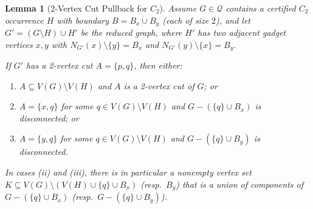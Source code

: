 \documentclass[12pt]{article}
\newtheorem{lemma}[theorem]{Lemma}
\begin{document}
\begin{lemma}[2-Vertex Cut Pullback for $C_2$]
\label{lem:pullback_cut_c2}
Assume $G\in\mathcal{Q}$ contains a certified $C_2$ occurrence $H$ with boundary
$B=B_x\dot\cup B_y$ (each of size $2$), and let $G'=(G\setminus H)\cup H'$ be the reduced graph,
where $H'$ has two adjacent gadget vertices $x,y$ with $N_{G'}(x)\setminus\{y\}=B_x$ and
$N_{G'}(y)\setminus\{x\}=B_y$.

If $G'$ has a 2-vertex cut $A=\{p,q\}$, then either:
\begin{enumerate}
\item[(i)] $A\subseteq V(G)\setminus V(H)$ and $A$ is a 2-vertex cut of $G$; or
\item[(ii)] $A=\{x,q\}$ for some $q\in V(G)\setminus V(H)$ and $G-(\{q\}\cup B_x)$ is disconnected; or
\item[(iii)] $A=\{y,q\}$ for some $q\in V(G)\setminus V(H)$ and $G-(\{q\}\cup B_y)$ is disconnected.
\end{enumerate}
In cases (ii) and (iii), there is in particular a nonempty vertex set
$K\subseteq V(G)\setminus (V(H)\cup\{q\}\cup B_x)$ (resp.\ $B_y$) that is a union of components of
$G-(\{q\}\cup B_x)$ (resp.\ $G-(\{q\}\cup B_y)$).
\end{lemma}
\end{document}
